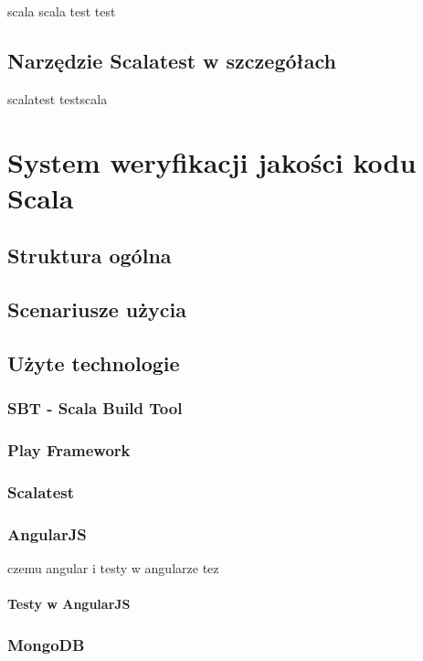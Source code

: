 \documentclass[brudnopis]{xmgr}
\begin{document}
scala scala test test 
      
\section{Narzędzie Scalatest w szczegółach}

scalatest testscala

\chapter{System weryfikacji jakości kodu Scala}

\section{Struktura ogólna}

\section{Scenariusze użycia}

\section{Użyte technologie}

\subsection{SBT - Scala Build Tool}

\subsection{Play Framework}

\subsection{Scalatest}

\subsection{AngularJS}

czemu angular i testy w angularze tez

\subsubsection{Testy w AngularJS}

\subsection{MongoDB}
\end{document}
